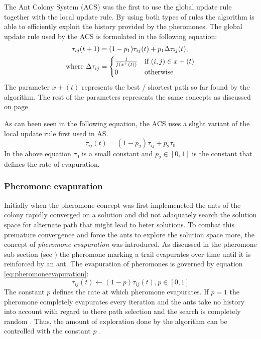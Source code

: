 The Ant Colony System (ACS) was the first to use the global update rule together with the local update rule\cite{CompuIntelligenceIntro}. By using both types of rules the algorithm is able to efficiently exploit the history provided by the pheromones\cite{CompuIntelligenceIntro}. The global update rule used by the ACS is formulated in the following equation\cite{CompuIntelligenceIntro}:
\begin{align}
	\tau_{ij}(t + 1) &= (1 - p_1)\tau_{ij}(t) + p_1\Delta\tau_{ij}(t),\\
	\text{where }\Delta\tau_{ij} &= \notag
	\begin{cases}
		\frac{1}{f(x^+(t))} &\text{if $(i,j) \in x+(t)$}\\
		0 &\text{otherwise}
	\end{cases}
\end{align}
The parameter $x+(t)$ represents the best / shortest path so far found by the algorithm\cite{CompuIntelligenceIntro}. The rest of the parameters represents the same concepts as discussed on page \pageref{eq:ASprobability}

As can been seen in the following equation, the ACS uses a slight variant of the local update rule first used in AS\cite{CompuIntelligenceIntro}.
\begin{equation}
	\tau_{ij}(t) = (1 - p_2)\tau_{ij} + p_2\tau_0
\end{equation}
In the above equation $\tau_0$ is a small constant and $p_2 \in [0,1]$ is the constant that defines the rate of evapuration\cite{CompuIntelligenceIntro}.

\subsubsection{Pheromone evapuration}
\label{sec:pheromoneevapuation}
Initially when the pheromone concept was first implemeneted the ants of the colony rapidly converged on a solution and did not adaquately search the solution space for alternate path that might lead to beter solutions. To combat this premature convergence and force the ants to explore the solution space more, the concept of \emph{pheromone evapuration} was introduced\cite{CompuIntelligenceIntro,AntsAndStigmergy,AntIntroTrends,AntSurvey}. As discussed in the pheromone sub section (see \pageref{sec:pheromonetrail}) the pheromone marking a trail evapurates over time until it is reinforced by an ant. The evapuration of pheromones is governed by equation \ref{eq:pheromoneevapuration}\cite{CompuIntelligenceIntro,AntsAndStigmergy,AntIntroTrends,AntSurvey}:
\begin{equation}
\label{eq:pheromoneevapuration}
	\tau_{ij}(t) \leftarrow (1-p)\tau_{ij}(t), p\in [0,1]
\end{equation}
The constant $p$ defines the rate at which pheromone evapurates. If $p=1$ the pheromone completely evapurates every iteration and the ants take no history into account with regard to there path selection and the search is completely random \cite{CompuIntelligenceIntro,AntsAndStigmergy}. Thus, the amount of exploration done by the algorithm can be controlled with the constant $p$ \cite{CompuIntelligenceIntro,AntsAndStigmergy}.

